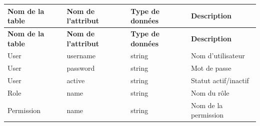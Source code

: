 \renewcommand{\arraystretch}{1.3} %

\begin{longtable}{|p{3.5cm}|p{3.5cm}|p{3cm}|p{5cm}|}
    \hline
    \textbf{Nom de la table} & \textbf{Nom de l'attribut} & \textbf{Type de données}    & \textbf{Description} \\
    \hline
    \endfirsthead

    \hline
    \textbf{Nom de la table} & \textbf{Nom de l'attribut} & \textbf{Type de données}    & \textbf{Description} \\
    \hline
    \endhead

    \hline
    User                     & username                   & string                      & Nom d'utilisateur    \\
    \hline
    User                     & password                   & string                      & Mot de passe         \\
    \hline
    User                     & active                     & string                      & Statut actif/inactif \\
    \hline

    Role                     & name                       & string                      & Nom du rôle          \\ \hline

    Permission               & name                       & string                      & Nom de la permission \\ \hline


\end{longtable}
